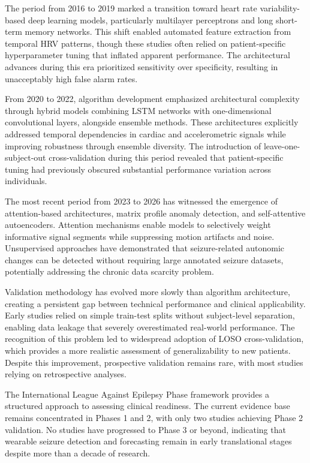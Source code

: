 The period from 2016 to 2019 marked a transition toward heart rate variability-based deep learning models, particularly multilayer perceptrons and long short-term memory networks. This shift enabled automated feature extraction from temporal HRV patterns, though these studies often relied on patient-specific hyperparameter tuning that inflated apparent performance. The architectural advances during this era prioritized sensitivity over specificity, resulting in unacceptably high false alarm rates.

From 2020 to 2022, algorithm development emphasized architectural complexity through hybrid models combining LSTM networks with one-dimensional convolutional layers, alongside ensemble methods. These architectures explicitly addressed temporal dependencies in cardiac and accelerometric signals while improving robustness through ensemble diversity. The introduction of leave-one-subject-out cross-validation during this period revealed that patient-specific tuning had previously obscured substantial performance variation across individuals.

The most recent period from 2023 to 2026 has witnessed the emergence of attention-based architectures, matrix profile anomaly detection, and self-attentive autoencoders. Attention mechanisms enable models to selectively weight informative signal segments while suppressing motion artifacts and noise. Unsupervised approaches have demonstrated that seizure-related autonomic changes can be detected without requiring large annotated seizure datasets, potentially addressing the chronic data scarcity problem.

Validation methodology has evolved more slowly than algorithm architecture, creating a persistent gap between technical performance and clinical applicability. Early studies relied on simple train-test splits without subject-level separation, enabling data leakage that severely overestimated real-world performance. The recognition of this problem led to widespread adoption of LOSO cross-validation, which provides a more realistic assessment of generalizability to new patients. Despite this improvement, prospective validation remains rare, with most studies relying on retrospective analyses.

The International League Against Epilepsy Phase framework provides a structured approach to assessing clinical readiness. The current evidence base remains concentrated in Phases 1 and 2, with only two studies achieving Phase 2 validation. No studies have progressed to Phase 3 or beyond, indicating that wearable seizure detection and forecasting remain in early translational stages despite more than a decade of research.

